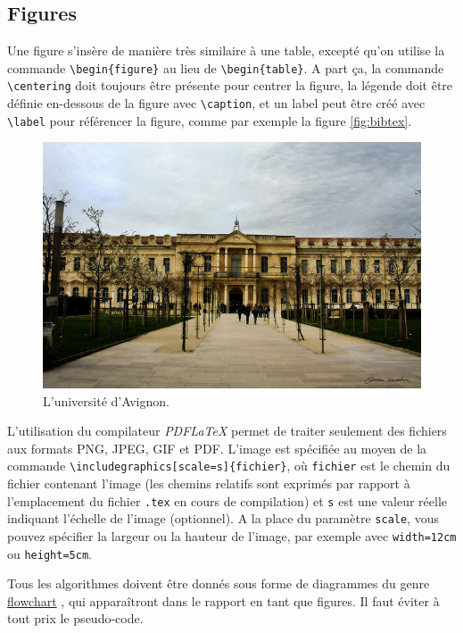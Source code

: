 \documentclass{ceri}
\begin{document}
\subsection{Figures}
\label{sec:figures}
Une figure s'insère de manière très similaire à une table, excepté qu'on utilise la commande \texttt{\textbackslash{}begin\{figure\}} au lieu de \texttt{\textbackslash{}begin\{table\}}. A part ça, la commande \texttt{\textbackslash{}centering} doit toujours être présente pour centrer la figure, la légende doit être définie en-dessous de la figure avec \texttt{\textbackslash{}caption}, et un label peut être créé avec \texttt{\textbackslash{}label} pour référencer la figure, comme par exemple la figure \ref{fig:bibtex}.

\begin{figure}[th]
	\centering
	\includegraphics[scale=0.5]{images/univ.jpg}
	\caption{L'université d'Avignon.}
	\label{fig:uapv}
\end{figure}

L'utilisation du compilateur \textit{PDFLaTeX} permet de traiter seulement des fichiers aux formats PNG, JPEG, GIF et PDF. L'image est spécifiée au moyen de la commande \texttt{\textbackslash{}includegraphics[scale=s]\{fichier\}}, où \texttt{fichier} est le chemin du fichier contenant l'image (les chemins relatifs sont exprimés par rapport à l'emplacement du fichier \texttt{.tex} en cours de compilation) et \texttt{s} est une valeur réelle indiquant l'échelle de l'image (optionnel). A la place du paramètre \texttt{scale}, vous pouvez spécifier la largeur ou la hauteur de l'image, par exemple avec \texttt{width=12cm} ou \texttt{height=5cm}.

Tous les algorithmes doivent être donnés sous forme de diagrammes du genre \href{http://en.wikipedia.org/wiki/Flowchart}{flowchart} \cite{Wikipedia2011}, qui apparaîtront dans le rapport en tant que figures. Il faut éviter à tout prix le pseudo-code. 
\end{document}

